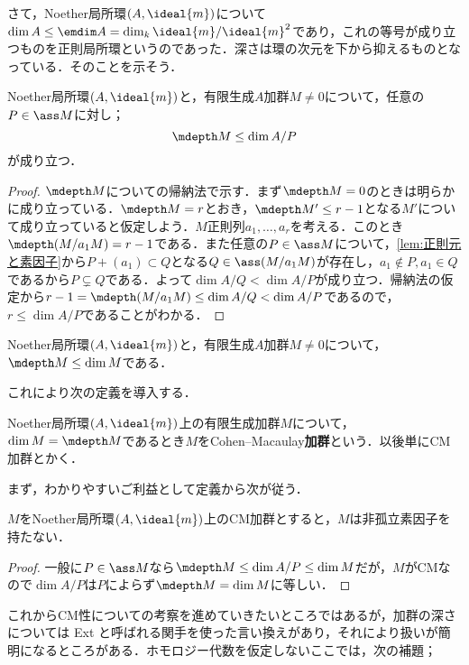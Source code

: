 さて，Noether局所環$(A,\ideal{m})$について$\dim A\leq \emdim A=\dim_k\ideal{m}/\ideal{m}^2$であり，これの等号が成り立つものを正則局所環というのであった．深さは環の次元を下から抑えるものとなっている．そのことを示そう．

\begin{prop}
	Noether局所環$(A,\ideal{m})$と，有限生成$A$加群$M\neq0$について，任意の$P\in\ass M$に対し；
	\[\mdepth M\leq\dim A/P\]
	が成り立つ．
\end{prop}

\begin{proof}
	$\mdepth M$についての帰納法で示す．まず$\mdepth M=0$のときは明らかに成り立っている．$\mdepth M=r$とおき，$\mdepth M'\leq r-1$となる$M'$について成り立っていると仮定しよう．$M$正則列$a_1,\dots,a_r$を考える．このとき$\mdepth (M/a_1M)=r-1$である．また任意の$P\in\ass M$について，\ref{lem:正則元と素因子}から$P+(a_1)\subset Q$となる$Q\in\ass (M/a_1M)$が存在し，$a_1\not\in P,a_1\in Q$であるから$P\subsetneq Q$である．よって$\dim A/Q<\dim A/P$が成り立つ．帰納法の仮定から$r-1=\mdepth (M/a_1M)\leq\dim A/Q<\dim A/P$であるので，$r\leq\dim A/P$であることがわかる． 
\end{proof}

\begin{cor}
	Noether局所環$(A,\ideal{m})$と，有限生成$A$加群$M\neq0$について，$\mdepth M\leq\dim M$である．
\end{cor}

これにより次の定義を導入する．

\begin{defi}
	Noether局所環$(A,\ideal{m})$上の有限生成加群$M$について，$\dim M=\mdepth M$であるとき$M$をCohen--Macaulay\textbf{加群}という．以後単にCM加群とかく．
\end{defi}

まず，わかりやすいご利益として定義から次が従う．

\begin{prop}\label{prop:CM加群は非孤立素因子を持たない}
	$M$をNoether局所環$(A,\ideal{m})$上のCM加群とすると，$M$は非孤立素因子を持たない．
\end{prop}

\begin{proof}
	一般に$P\in\ass M$なら$\mdepth M\leq\dim A/P\leq\dim M$だが，$M$がCMなので$\dim A/P$は$P$によらず$\mdepth M=\dim M$に等しい．
\end{proof}
これからCM性についての考察を進めていきたいところではあるが，加群の深さについては Ext と呼ばれる関手を使った言い換えがあり，それにより扱いが簡明になるところがある．ホモロジー代数を仮定しないここでは，次の補題；

